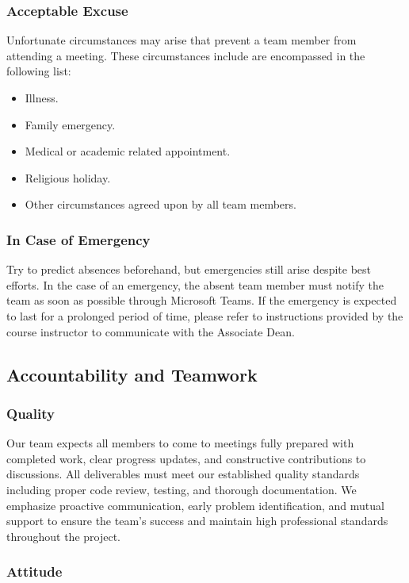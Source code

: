 \documentclass{article}
\begin{document}
\subsubsection*{Acceptable Excuse}

Unfortunate circumstances may arise that prevent a team member from attending a
meeting. These circumstances include are encompassed in the following list:
\begin{itemize}
  \item Illness.
  \item Family emergency.
  \item Medical or academic related appointment.
  \item Religious holiday.
  \item Other circumstances agreed upon by all team members.
\end{itemize}

\subsubsection*{In Case of Emergency}

Try to predict absences beforehand, but emergencies still arise despite best
efforts. In the case of an emergency, the absent team member must notify the
team as soon as possible through Microsoft Teams. If the emergency is expected
to last for a prolonged period of time, please refer to instructions provided by
the course instructor to communicate with the Associate Dean.

\subsection*{Accountability and Teamwork}

\subsubsection*{Quality} 

Our team expects all members to come to meetings fully prepared with completed
work, clear progress updates, and constructive contributions to discussions. All
deliverables must meet our established quality standards including proper code
review, testing, and thorough documentation. We emphasize proactive
communication, early problem identification, and mutual support to ensure the
team's success and maintain high professional standards throughout the project.

\subsubsection*{Attitude}
\end{document}
